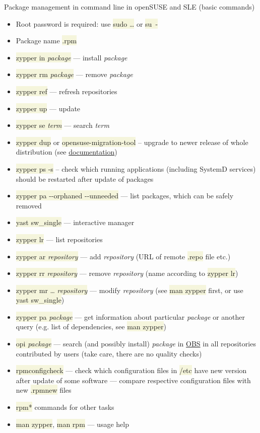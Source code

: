\documentclass[compress, xelatex, 11pt, xcolor=svgnames, aspectratio=169, url={hyphens, lowtilde}]{beamer}
\renewcommand{\texttt}[1]{\colorbox{Beige}{{\ttfamily #1}}}
\begin{document}
\begin{frame}[allowframebreaks]{Package management in command line in openSUSE and SLE (basic commands)}
	\begin{itemize}
		\item Root password is required: use \texttt{sudo \ldots} or \texttt{su~-}
		\item Package name \texttt{*.rpm}
		\item \texttt{zypper in \textit{package}} --- install \textit{package}
		\item \texttt{zypper rm \textit{package}} --- remove \textit{package}
		\item \texttt{zypper ref} --- refresh repositories
		\item \texttt{zypper up} --- update
		\item \texttt{zypper se \textit{term}} --- search \textit{term}
		\item \texttt{zypper dup} or \texttt{opensuse-migration-tool} -- upgrade to newer release of whole distribution (see \href{https://en.opensuse.org/SDB:System_upgrade}{documentation})
		\item \texttt{zypper ps -s} -- check which running applications (including SystemD services) should be restarted after update of packages
		\item \texttt{zypper pa -{-}orphaned -{-}unneeded} --- list packages, which can be safely removed
		\item \texttt{yast sw\_single} --- interactive manager
		\item \texttt{zypper lr} --- list repositories
		\item \texttt{zypper ar \textit{repository}} --- add \textit{repository} (URL of remote \texttt{*.repo} file etc.)
		\item \texttt{zypper rr \textit{repository}} --- remove \textit{repository} (name according to \texttt{zypper lr})
		\item \texttt{zypper mr \ldots{ }\textit{repository}} --- modify \textit{repository} (see \texttt{man zypper} first, or use \texttt{yast sw\_single})
		\item \texttt{zypper pa \textit{package}} --- get information about particular \textit{package} or another query (e.g. list of dependencies, see \texttt{man zypper})
		\item \texttt{opi \textit{package}} --- search (and possibly install) \textit{package} in \href{https://build.opensuse.org/}{OBS} in all repositories contributed by users (take care, there are no quality checks)
		\item \texttt{rpmconfigcheck} --- check which configuration files in \texttt{/etc} have new version after update of some software --- compare respective configuration files with new \texttt{*.rpmnew} files
		\item \texttt{rpm*} commands for other tasks
		\item \texttt{man zypper}, \texttt{man rpm} --- usage help
	\end{itemize}
\end{frame}
\end{document}
